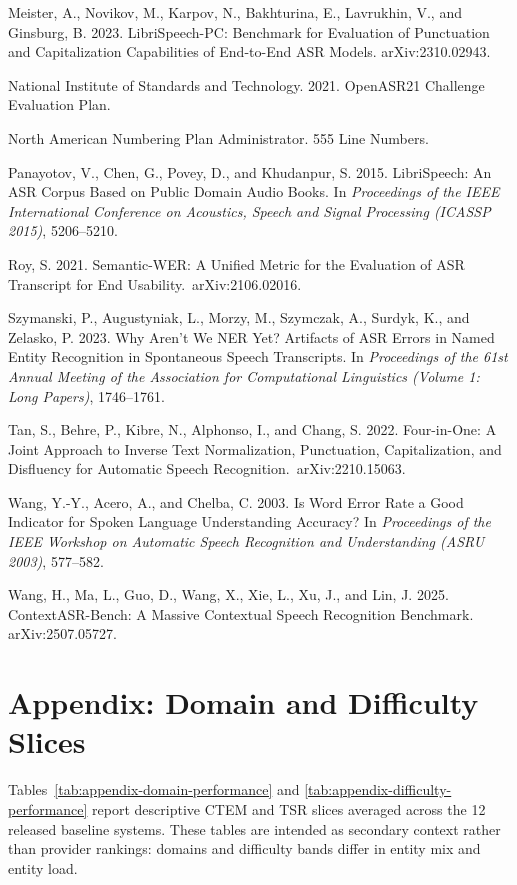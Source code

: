 \documentclass[10pt,twocolumn]{article}
\begin{document}
Meister, A., Novikov, M., Karpov, N., Bakhturina, E., Lavrukhin, V., and
Ginsburg, B. 2023. LibriSpeech-PC\@: Benchmark for Evaluation of
Punctuation and Capitalization Capabilities of End-to-End ASR Models.
arXiv:2310.02943.

National Institute of Standards and Technology. 2021. OpenASR21
Challenge Evaluation Plan.

North American Numbering Plan Administrator. 555 Line Numbers.

Panayotov, V., Chen, G., Povey, D., and Khudanpur, S. 2015. LibriSpeech:
An ASR Corpus Based on Public Domain Audio Books. In \emph{Proceedings
	of the IEEE International Conference on Acoustics, Speech and Signal
	Processing (ICASSP 2015)}, 5206--5210.

Roy, S. 2021. Semantic-WER\@: A Unified Metric for the Evaluation of ASR
Transcript for End Usability.\ arXiv:2106.02016.

Szymanski, P., Augustyniak, L., Morzy, M., Szymczak, A., Surdyk, K., and
Zelasko, P. 2023. Why Aren't We NER Yet? Artifacts of ASR Errors in
Named Entity Recognition in Spontaneous Speech Transcripts. In
\emph{Proceedings of the 61st Annual Meeting of the Association for
	Computational Linguistics (Volume 1: Long Papers)}, 1746--1761.

Tan, S., Behre, P., Kibre, N., Alphonso, I., and Chang, S. 2022.
Four-in-One: A Joint Approach to Inverse Text Normalization,
Punctuation, Capitalization, and Disfluency for Automatic Speech
Recognition.\ arXiv:2210.15063.

Wang, Y.-Y., Acero, A., and Chelba, C. 2003. Is Word Error Rate a Good
Indicator for Spoken Language Understanding Accuracy? In
\emph{Proceedings of the IEEE Workshop on Automatic Speech Recognition
	and Understanding (ASRU 2003)}, 577--582.

Wang, H., Ma, L., Guo, D., Wang, X., Xie, L., Xu, J., and Lin, J. 2025.
ContextASR-Bench: A Massive Contextual Speech Recognition Benchmark.
arXiv:2507.05727.

\appendix

\section{Appendix: Domain and Difficulty
	Slices}\label{appendix-domain-difficulty-slices}

Tables~\ref{tab:appendix-domain-performance} and
\ref{tab:appendix-difficulty-performance} report descriptive CTEM and
TSR slices averaged across the 12 released baseline systems. These
tables are intended as secondary context rather than provider rankings:
domains and difficulty bands differ in entity mix and entity load.
\end{document}
